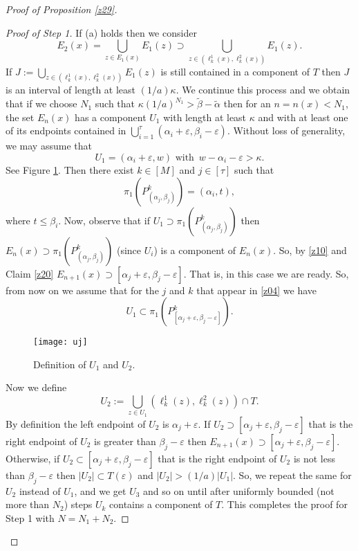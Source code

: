 \documentclass[amssymb,amsfonts,12pt,verbatim,righttag,oneside]{amsart}
\numberwithin{equation}{section} %
\theoremstyle{plain}
\newcommand{\fmu}{\ensuremath{\,}}
\theoremstyle{plain}
\begin{document}
\begin{proof}[Proof of Proposition \ref{z29}]
\begin{proof}[Proof of Step 1]
If (a) holds then we consider
$$
E_2(x)=\bigcup\limits_{z\in E_1(x)}E_1(z)\supset
\bigcup\limits_{z\in (\ell  _{k}^{1 }(x),\ell  _{k}^{2 }(x))
}E_1(z).
$$
If $J:=\bigcup\limits_{z\in (\ell  _{k}^{1 }(x),\ell  _{k}^{2 }(x))
}E_1(z)$ is still contained in a component of $T$ then $J$ is an interval of length at least $(1/a)\kappa $. We continue this process and we obtain that if we choose $N_1$ such that $\kappa  (1/a)^{N_1}> \widetilde{\beta }-\widetilde{\alpha }$ then for an $n=n(x)<N_1$, the set
$E_n(x)$ has a component $U_1$ with length at least $\kappa $ and with at least one of its endpoints contained in
$\bigcup\limits_{i=1}^{\tau }\left( {\alpha _i+\varepsilon ,\beta_i -\varepsilon}  \right)$.
Without loss of generality, we may assume that
$$
U_1=(\alpha _i+\varepsilon ,w) \text{ with } \fmu w-\alpha _i-\varepsilon>\kappa.
$$
See Figure \ref{y94}.
  {Then there exist $k\in [M]$ and $j\in [\tau ]$ such that
\begin{equation}
\label{a98}
\pi _1\left( P _{(\alpha _j,\beta _j)}^{ k}\right)=(\alpha _i,t),
\end{equation}
where $t\leq \beta _i$.
Now, observe that
if $U_1 \supset \pi _1(P _{(\alpha _j,\beta _j)}^{ k})$ then
$E_n(x)\supset \pi _1(P _{(\alpha _j,\beta _j)}^{ k})$ (since $U_i$) is a component of $E_n(x)$. So, by \eqref{z10} and Claim \eqref{z20}
$E_{n+1}(x)\supset [\alpha _j+\varepsilon ,\beta _j-\varepsilon ]     $.}
That is, in this case we are ready. So, from now on we assume that for the  $j$ and $k$ that appear in \eqref{z04} we have
\begin{equation}
\label{z04}
U_1\subset \pi _1\left(
 P _{[\alpha _j+\varepsilon ,\beta _j-\varepsilon ]}^{k } \right).
\end{equation}

\begin{figure}[H]
  \centering
  \texttt{[image: uj]}
  \caption{Definition of $U_1$ and $U_2$. }
    \label{y94}
\end{figure}


Now we define
$$
  {U_2:=\bigcup\limits_{z\in U_1}\left(\ell  _{k}^{1 }(z),\ell  _{k}^{2 }(z)\right)\cap T.}
$$
By definition the left endpoint of $U_2$ is $\alpha _j+\varepsilon $.
If $U_2\supset [\alpha _j+\varepsilon ,\beta _j-\varepsilon ]$ that is the right endpoint of $U_2$ is greater than $\beta _j-\varepsilon$
then $E_{n+1}(x)\supset [\alpha _j+\varepsilon ,\beta _j-\varepsilon ]$. Otherwise,
if $U_2\subset [\alpha _j+\varepsilon ,\beta _j-\varepsilon ]$ that is the right endpoint of $U_2$ is not less than $\beta _j-\varepsilon $
then $|U_2|\subset T(\varepsilon )$ and $|U_2|>(1/a)|U_1|$. So, we repeat the same for $U_2$ instead of $U_1$, and we get $U_3$ and so on until after uniformly bounded (not more than $N_2$) steps  $U_k$ contains a component of $T$. This completes the proof for Step 1 with $N=N_1+N_2$.
\end{proof}



\end{proof}
\end{document}
